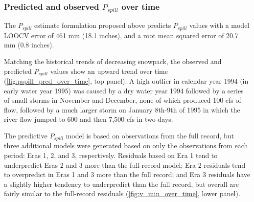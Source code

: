 \documentclass[hess, manuscript]{copernicus}
\begin{document}
\subsubsection{\texorpdfstring{Predicted and observed \(P_{spill}\) over
time}{Predicted and observed P\_\{spill\} over time}}

The \(P_{spill}\) estimate formulation proposed above predicts
\(P_{spill}\) values with a model LOOCV error of 461 mm (18.1 inches),
and a root mean squared error of 20.7 mm (0.8 inches).

Matching the historical trends of decreasing snowpack, the observed and
predicted \(P_{spill}\) values show an upward trend over time
(\autoref{fig:pspill_pred_over_time}, top panel). A high outlier in
calendar year 1994 (in early water year 1995) was caused by a dry water
year 1994 followed by a series of small storms in November and December,
none of which produced 100 cfs of flow, followed by a much larger storm
on January 8th-9th of 1995 in which the river flow jumped to 600 and
then 7,500 cfs in two days.

The predictive \(P_{spill}\) model is based on observations from the
full record, but three additional models were generated based on only
the observations from each period: Eras 1, 2, and 3, respectively.
Residuals based on Era 1 tend to underpredict Eras 2 and 3 more than the
full-record model; Era 2 residuals tend to overpredict in Eras 1 and 3
more than the full record; and Era 3 residuals have a slightly higher
tendency to underpredict than the full record, but overall are fairly
similar to the full-record residuals (\autoref{fig:v_min_over_time},
lower panel).
\end{document}
